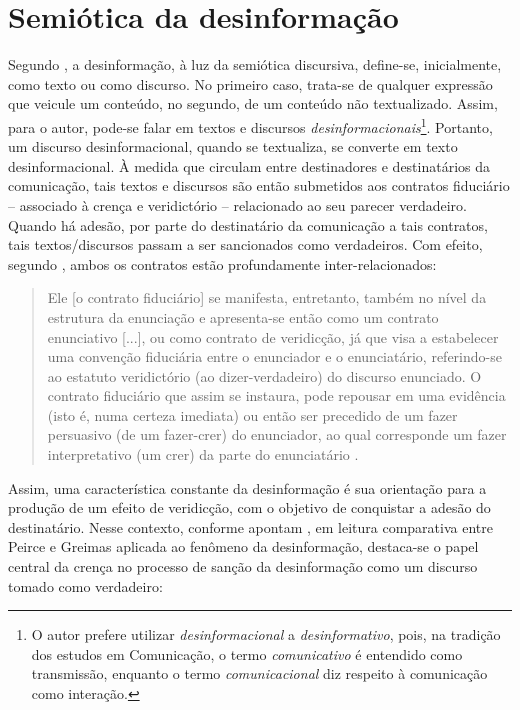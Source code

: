 \documentclass[portuguese]{textolivre}
\begin{document}
\section{Semiótica da desinformação}\label{sec-semiotica-desin}
Segundo \textcite{mendes2025}, a desinformação, à luz da semiótica discursiva, define-se, inicialmente, como texto ou como discurso. No primeiro caso, trata-se de qualquer expressão que veicule um conteúdo, no segundo, de um conteúdo não textualizado. Assim, para o autor, pode-se falar em textos e discursos \emph{desinformacionais}\footnote{O autor prefere utilizar \emph{desinformacional} a \emph{desinformativo}, pois, na tradição dos estudos em Comunicação, o termo \emph{comunicativo} é entendido como transmissão, enquanto o termo \emph{comunicacional} diz respeito à comunicação como interação.}. Portanto, um discurso desinformacional, quando se textualiza, se converte em texto desinformacional. À medida que circulam entre destinadores e destinatários da comunicação, tais textos e discursos são então submetidos aos contratos fiduciário -- associado à crença e veridictório -- relacionado ao seu parecer verdadeiro. Quando há adesão, por parte do destinatário da comunicação a tais contratos, tais textos/discursos passam a ser sancionados como verdadeiros. Com efeito, segundo \textcite{greimas2008}, ambos os contratos estão profundamente inter-relacionados:

\begin{quote}
    Ele [o contrato fiduciário] se manifesta, entretanto, também no nível da estrutura da enunciação e apresenta-se então como um contrato enunciativo [...], ou como contrato de veridicção, já que visa a estabelecer uma convenção fiduciária entre o enunciador e o enunciatário, referindo-se   ao   estatuto   veridictório (ao dizer-verdadeiro) do discurso enunciado. O contrato fiduciário que assim se instaura, pode repousar em uma evidência (isto é, numa certeza imediata) ou então ser precedido de um fazer persuasivo (de um fazer-crer) do enunciador, ao   qual   corresponde   um   fazer interpretativo (um crer) da parte do enunciatário \cite[p. 86, grifos dos autores]{greimas2008}.
\end{quote}

Assim, uma característica constante da desinformação é sua orientação para a produção de um efeito de veridicção, com o objetivo de conquistar a adesão do destinatário. Nesse contexto, conforme apontam \textcite{ribeiro2022}, em leitura comparativa entre Peirce e Greimas aplicada ao fenômeno da desinformação, destaca-se o papel central da crença no processo de sanção da desinformação como um discurso tomado como verdadeiro:
\end{document}
